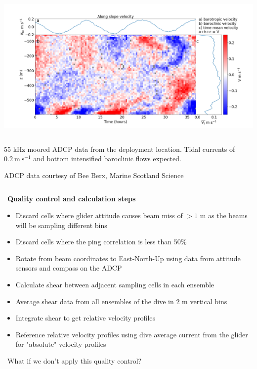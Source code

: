\documentclass[unknownkeysallowed,usepdftitle=false]{beamer}
\newcommand{\secvariable}{nothing}
\newcommand{\mysection}[1]{\renewcommand{\secvariable}{#1}
}
\begin{document}
\begin{frame}\label{fsc_shear}
\vspace*{-10mm}    
\begin{center}
\includegraphics[trim=20 20 20 60,clip,width=\paperwidth]{figure/adcp_fsc.png}
\end{center}
\vspace*{-5mm}    
\begin{columns}
\begin{column}[t]{0.9\textwidth}
55 kHz moored ADCP data from the deployment location. Tidal currents of $0.2\ \mathrm{m\ s^{-1}}$ and bottom intensified baroclinic flows expected.

ADCP data courtesy of Bee Berx, Marine Scotland Science
\end{column}
\end{columns}
 
\end{frame}
\mysection{qc}
\begin{frame}\label{\secvariable}
\ \textbf{Quality control  and calculation steps}
\begin{itemize}
\item Discard cells where glider attitude causes beam miss of $> 1$ m as the beams will be sampling different bins \hyperlink{flight_envelope}{}
\item Discard cells where the ping correlation is less than 50\%
 \hyperlink{ping_corr}{}
\item Rotate from beam coordinates to East-North-Up using data from attitude sensors and compass on the ADCP
\item Calculate shear between adjacent sampling cells in each ensemble
\item Average shear data from all ensembles of the dive in 2 m vertical bins
\item Integrate shear to get relative velocity profiles
\item Reference relative velocity profiles using dive average current from the glider for "absolute" velocity profiles

\end{itemize}
\ What if we don't apply this quality control? \hyperlink{no_qc}{}
\end{frame}
\end{document}

